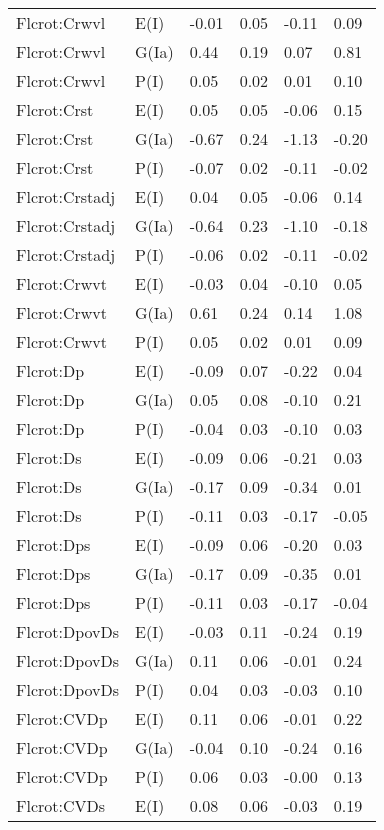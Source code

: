 \begin{center}
\begin{longtable}{|p{1.1in}|p{0.7in}|p{0.7in}|p{0.6in}|p{0.6in}|p{0.6in}|}
  Flcrot:Crwvl & E(I) & -0.01 & 0.05 & -0.11 & 0.09 \\ 
  Flcrot:Crwvl & G(Ia) & 0.44 & 0.19 & 0.07 & 0.81 \\ 
  Flcrot:Crwvl & P(I) & 0.05 & 0.02 & 0.01 & 0.10 \\ 
  Flcrot:Crst & E(I) & 0.05 & 0.05 & -0.06 & 0.15 \\ 
  Flcrot:Crst & G(Ia) & -0.67 & 0.24 & -1.13 & -0.20 \\ 
  Flcrot:Crst & P(I) & -0.07 & 0.02 & -0.11 & -0.02 \\ 
  Flcrot:Crstadj & E(I) & 0.04 & 0.05 & -0.06 & 0.14 \\ 
  Flcrot:Crstadj & G(Ia) & -0.64 & 0.23 & -1.10 & -0.18 \\ 
  Flcrot:Crstadj & P(I) & -0.06 & 0.02 & -0.11 & -0.02 \\ 
  Flcrot:Crwvt & E(I) & -0.03 & 0.04 & -0.10 & 0.05 \\ 
  Flcrot:Crwvt & G(Ia) & 0.61 & 0.24 & 0.14 & 1.08 \\ 
  Flcrot:Crwvt & P(I) & 0.05 & 0.02 & 0.01 & 0.09 \\ 
  Flcrot:Dp & E(I) & -0.09 & 0.07 & -0.22 & 0.04 \\ 
  Flcrot:Dp & G(Ia) & 0.05 & 0.08 & -0.10 & 0.21 \\ 
  Flcrot:Dp & P(I) & -0.04 & 0.03 & -0.10 & 0.03 \\ 
  Flcrot:Ds & E(I) & -0.09 & 0.06 & -0.21 & 0.03 \\ 
  Flcrot:Ds & G(Ia) & -0.17 & 0.09 & -0.34 & 0.01 \\ 
  Flcrot:Ds & P(I) & -0.11 & 0.03 & -0.17 & -0.05 \\ 
  Flcrot:Dps & E(I) & -0.09 & 0.06 & -0.20 & 0.03 \\ 
  Flcrot:Dps & G(Ia) & -0.17 & 0.09 & -0.35 & 0.01 \\ 
  Flcrot:Dps & P(I) & -0.11 & 0.03 & -0.17 & -0.04 \\ 
  Flcrot:DpovDs & E(I) & -0.03 & 0.11 & -0.24 & 0.19 \\ 
  Flcrot:DpovDs & G(Ia) & 0.11 & 0.06 & -0.01 & 0.24 \\ 
  Flcrot:DpovDs & P(I) & 0.04 & 0.03 & -0.03 & 0.10 \\ 
  Flcrot:CVDp & E(I) & 0.11 & 0.06 & -0.01 & 0.22 \\ 
  Flcrot:CVDp & G(Ia) & -0.04 & 0.10 & -0.24 & 0.16 \\ 
  Flcrot:CVDp & P(I) & 0.06 & 0.03 & -0.00 & 0.13 \\ 
  Flcrot:CVDs & E(I) & 0.08 & 0.06 & -0.03 & 0.19 \\ 

\end{longtable}
\end{center}
